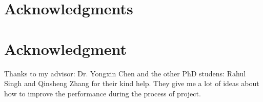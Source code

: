 \documentclass[conference,compsoc]{IEEEtran}
\begin{document}
\ifCLASSOPTIONcompsoc
  \section*{Acknowledgments}
\else
  \section*{Acknowledgment}
\fi


Thanks to my advisor: Dr. Yongxin Chen and the other PhD studens: Rahul Singh and Qinsheng Zhang for their kind help. They give me a lot of ideas about how to improve the performance during the process of project.



\end{document}
